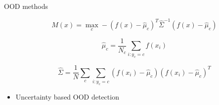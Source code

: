 \documentclass[10pt, aspectratio=169]{beamer}
\begin{document}
\begin{frame}[allowframebreaks]{OOD methods}
\begin{itemize}
        \begin{equation}
            M(x)=\max _{c}-\left(f(x)-\hat{\mu}_{c}\right)^{T} \hat{\Sigma}^{-1}\left(f(x)-\hat{\mu}_{c}\right)
        \end{equation}

        $$\hat{\mu}_{c}=\frac{1}{N_{c}} \sum_{i: y_{c}=c} f\left(x_{i}\right)$$
            
        $$\hat{\Sigma}=\frac{1}{N} \sum_{c} \sum_{i: y_{c}=c}\left(f\left(x_{i}\right)-\hat{\mu}_{c}\right)\left(f\left(x_{i}\right)-\hat{\mu}_{c}\right)^{T} $$ \newline \newline \newline
        
        \item Uncertainty based OOD detection
        

\end{itemize}
\end{frame}
\end{document}
